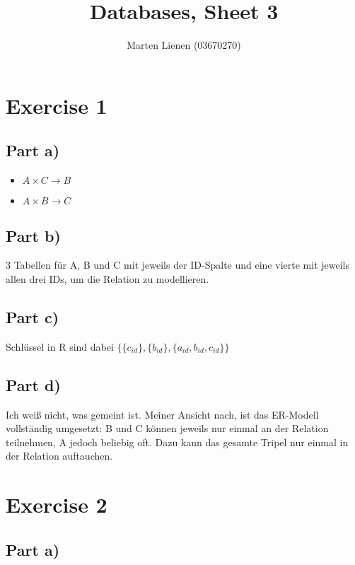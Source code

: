 \documentclass[10pt,a4paper]{article}
\title{Databases, Sheet 3}
\author{Marten Lienen (03670270)}
\begin{document}
\maketitle

\section*{Exercise 1}

\subsection*{Part a)}

\begin{itemize}
\item $A \times C \rightarrow B$
\item $A \times B \rightarrow C$
\end{itemize}

\subsection*{Part b)}

3 Tabellen für A, B und C mit jeweils der ID-Spalte und eine vierte mit jeweils allen drei IDs, um die Relation zu modellieren.

\subsection*{Part c)}

Schlüssel in R sind dabei $\{ \{ c_{id} \}, \{ b_{id} \}, \{ a_{id}, b_{id}, c_{id} \} \}$

\subsection*{Part d)}

Ich weiß nicht, was gemeint ist.
Meiner Ansicht nach, ist das ER-Modell vollständig umgesetzt: B und C können jeweils nur einmal an der Relation teilnehmen, A jedoch beliebig oft.
Dazu kann das gesamte Tripel nur einmal in der Relation auftauchen.

\section*{Exercise 2}

\subsection*{Part a)}
\end{document}
